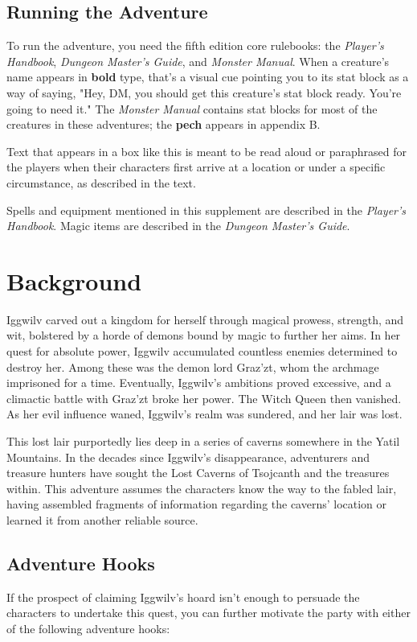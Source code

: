 \documentclass[10pt,a4paper,twoside,bg=print,twocolumn,openany,nodeprecatedcode]{dndbook}
\begin{document}
\subsection{Running the Adventure}
To run the adventure, you need the fifth edition core rulebooks: the \textit{Player's Handbook}, \textit{Dungeon Master's Guide}, and \textit{Monster Manual}. When a creature's name appears in \textbf{bold} type, that's a visual cue pointing you to its stat block as a way of saying, "Hey, DM, you should get this creature's stat block ready. You're going to need it." The \textit{Monster Manual} contains stat blocks for most of the creatures in these adventures; the \textbf{pech} appears in appendix B.

\begin{DndReadAloud}{}
Text that appears in a box like this is meant to be read aloud or paraphrased for the players when their characters first arrive at a location or under a specific circumstance, as described in the text.

\end{DndReadAloud}

Spells and equipment mentioned in this supplement are described in the \textit{Player's Handbook}. Magic items are described in the \textit{Dungeon Master's Guide}.

\section{Background}
Iggwilv carved out a kingdom for herself through magical prowess, strength, and wit, bolstered by a horde of demons bound by magic to further her aims. In her quest for absolute power, Iggwilv accumulated countless enemies determined to destroy her. Among these was the demon lord Graz'zt, whom the archmage imprisoned for a time. Eventually, Iggwilv's ambitions proved excessive, and a climactic battle with Graz'zt broke her power. The Witch Queen then vanished. As her evil influence waned, Iggwilv's realm was sundered, and her lair was lost.

This lost lair purportedly lies deep in a series of caverns somewhere in the Yatil Mountains. In the decades since Iggwilv's disappearance, adventurers and treasure hunters have sought the Lost Caverns of Tsojcanth and the treasures within. This adventure assumes the characters know the way to the fabled lair, having assembled fragments of information regarding the caverns' location or learned it from another reliable source.

\subsection{Adventure Hooks}
If the prospect of claiming Iggwilv's hoard isn't enough to persuade the characters to undertake this quest, you can further motivate the party with either of the following adventure hooks:
\end{document}
